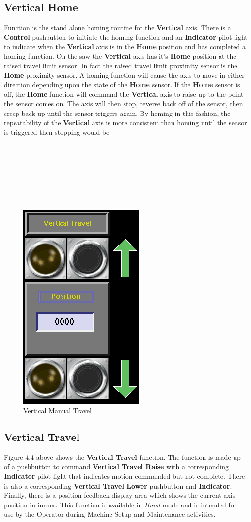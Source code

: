 \subsection{Vertical Home} Function is the stand alone homing routine for the \textbf{Vertical} axis. There is a \textbf{Control} pushbutton to initiate the homing function and an \textbf{Indicator} pilot light to indicate when the \textbf{Vertical} axis is in the \textbf{Home} position and has completed a homing function. On the saw the \textbf{Vertical} axis has it's \textbf{Home} position at the raised travel limit sensor. In fact the raised travel limit proximity sensor is the \textbf{Home} proximity sensor. A homing function will cause the axis to move in either direction depending upon the state of the \textbf{Home} sensor. If the \textbf{Home} sensor is off, the \textbf{Home} function will command the \textbf{Vertical} axis to raise up to the point the sensor comes on. The axis will then stop, reverse back off of the sensor, then creep back up until the sensor triggers again. By homing in this fashion, the repeatability of the \textbf{Vertical} axis is more consistent than homing until the sensor is triggered then stopping would be.
\\
\\
\\
\\
\\
\\
\\
\\
\pagebreak
\nopagebreak
\begin{figure}
	\centering
	\includegraphics[width=.2\linewidth]{screen-captures/vert-manual-command}
	\caption{Vertical Manual Travel}
	\label{fig:vert-manual-command}
\end{figure}
\subsection{Vertical Travel} Figure 4.4 above shows the \textbf{Vertical Travel} function. The function is made up of a pushbutton to command \textbf{Vertical Travel Raise} with a corresponding \textbf{Indicator} pilot light that indicates motion commanded but not complete. There is also a corresponding \textbf{Vertical Travel Lower} pushbutton and \textbf{Indicator}. Finally, there is a position feedback display area which shows the current axis position in inches. This function is available in \textit{Hand} mode and is intended for use by the Operator during Machine Setup and Maintenance activities. 
